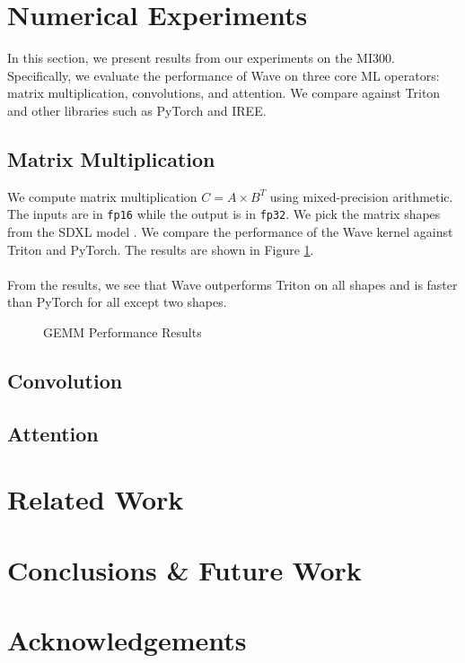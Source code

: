 \documentclass{article}
\begin{document}
\section{Numerical Experiments}
\label{section:numerical_experiments}
In this section, we present results from our experiments on the MI300. Specifically, we evaluate the performance of Wave on three core ML operators: matrix multiplication, convolutions, and attention.
We compare against Triton and other libraries such as PyTorch and IREE.

\subsection{Matrix Multiplication}
We compute matrix multiplication $C = A \times B^{T}$ using mixed-precision
arithmetic. The inputs are in \texttt{fp16} while the output is in \texttt{fp32}.
We pick the matrix shapes from the SDXL model \cite{podell2023sdxlimprovinglatentdiffusion}.
We compare the performance of the Wave kernel against Triton and PyTorch. The results are shown in Figure \ref{fig:gemm_results}.
\\ \\
From the results, we see that Wave outperforms Triton on all shapes and is faster
than PyTorch for all except two shapes.


\begin{figure}[htbp]
    \def\svgwidth{0.5\textwidth}
    
    \caption{GEMM Performance Results}
    \label{fig:gemm_results}
\end{figure}

\subsection{Convolution}
\subsection{Attention}

\section{Related Work}
\label{section:related_work}

\section{Conclusions \& Future Work}
\label{section:conclusions}

\section{Acknowledgements}
\label{section:acknowledgements}
\end{document}
